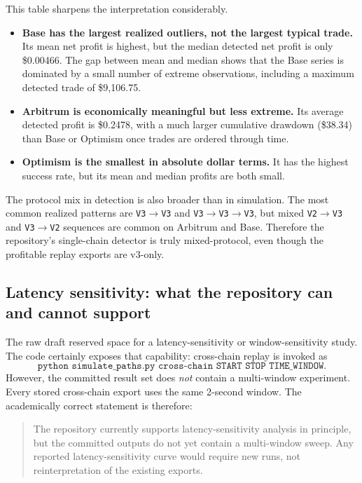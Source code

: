 \documentclass[11pt]{article}
\begin{document}
This table sharpens the interpretation considerably.
\begin{itemize}[leftmargin=1.5em]
    \item \textbf{Base has the largest realized outliers, not the largest typical trade.} Its mean net profit is highest, but the median detected net profit is only \$0.00466. The gap between mean and median shows that the Base series is dominated by a small number of extreme observations, including a maximum detected trade of \$9{,}106.75.
    \item \textbf{Arbitrum is economically meaningful but less extreme.} Its average detected profit is \$0.2478, with a much larger cumulative drawdown (\$38.34) than Base or Optimism once trades are ordered through time.
    \item \textbf{Optimism is the smallest in absolute dollar terms.} It has the highest success rate, but its mean and median profits are both small.
\end{itemize}

The protocol mix in detection is also broader than in simulation. The most common realized patterns are \texttt{V3$\rightarrow$V3} and \texttt{V3$\rightarrow$V3$\rightarrow$V3}, but mixed \texttt{V2$\rightarrow$V3} and \texttt{V3$\rightarrow$V2} sequences are common on Arbitrum and Base. Therefore the repository's single-chain detector is truly mixed-protocol, even though the profitable replay exports are v3-only.

\subsection{Latency sensitivity: what the repository can and cannot support}

The raw draft reserved space for a latency-sensitivity or window-sensitivity study. The code certainly exposes that capability: cross-chain replay is invoked as
\[
\texttt{python simulate\_paths.py cross-chain START STOP TIME\_WINDOW}.
\]
However, the committed result set does \emph{not} contain a multi-window experiment. Every stored cross-chain export uses the same 2-second window. The academically correct statement is therefore:
\begin{quote}
The repository currently supports latency-sensitivity analysis in principle, but the committed outputs do not yet contain a multi-window sweep. Any reported latency-sensitivity curve would require new runs, not reinterpretation of the existing exports.
\end{quote}
\end{document}
